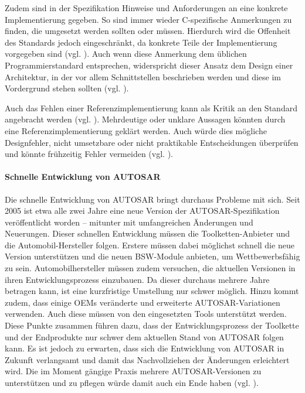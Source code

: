 \documentclass[
  a4paper,					    %
  twoside,
  DIV=calc,     				%
  bibliography=totoc,
  cleardoublepage=empty,
  ngerman,     					%
  final       					%
]{scrbook}
\begin{document}
Zudem sind in der Spezifikation Hinweise und Anforderungen an eine konkrete Implementierung gegeben. So sind immer wieder C-spezifische Anmerkungen zu finden, die umgesetzt werden sollten oder müssen. Hierdurch wird die Offenheit des Standards jedoch eingeschränkt, da konkrete Teile der Implementierung vorgegeben sind (vgl. \cite[Seite 20]{autosar_eth}). Auch wenn diese Anmerkung dem üblichen Programmierstandard entsprechen, widerspricht dieser Ansatz dem Design einer Architektur, in der vor allem Schnittstellen beschrieben werden und diese im Vordergrund stehen sollten (vgl. \cite{objektorientierung}).

Auch das Fehlen einer Referenzimplementierung kann als Kritik an den Standard angebracht werden (vgl. \cite{Hoffmann200803}). Mehrdeutige oder unklare Aussagen könnten durch eine Referenzimplementierung geklärt werden. Auch würde dies mögliche Designfehler, nicht umsetzbare oder nicht praktikable Entscheidungen überprüfen und könnte frühzeitig Fehler vermeiden (vgl. \cite{testing}).

\paragraph{Schnelle Entwicklung von AUTOSAR}
Die schnelle Entwicklung von AUTOSAR bringt durchaus Probleme mit sich. Seit 2005 ist etwa alle zwei Jahre eine neue Version der AUTOSAR-Spezifikation veröffentlicht worden -- mitunter mit umfangreichen Änderungen und Neuerungen. Dieser schnellen Entwicklung müssen die Toolketten-Anbieter und die Automobil-Hersteller folgen. Erstere müssen dabei möglichst schnell die neue Version unterstützen und die neuen BSW-Module anbieten, um Wettbewerbsfähig zu sein. Automobilhersteller müssen zudem versuchen, die aktuellen Versionen in ihren Entwicklungsprozess einzubauen. Da dieser durchaus mehrere Jahre betragen kann, ist eine kurzfristige Umstellung nur schwer möglich. Hinzu kommt zudem, dass einige OEMs veränderte und erweiterte AUTOSAR-Variationen verwenden. Auch diese müssen von den eingesetzten Tools unterstützt werden. Diese Punkte zusammen führen dazu, dass der Entwicklungsprozess der Toolkette und der Endprodukte nur schwer dem aktuellen Stand von AUTOSAR folgen kann. Es ist jedoch zu erwarten, dass sich die Entwicklung von AUTOSAR in Zukunft verlangsamt und damit das Nachvollziehen der Änderungen erleichtert wird. Die im Moment gängige Praxis mehrere AUTOSAR-Versionen zu unterstützen und zu pflegen würde damit auch ein Ende haben (vgl. \cite{as_kritik}\cite[Seite 179]{SE_Autosar}).
\end{document}
